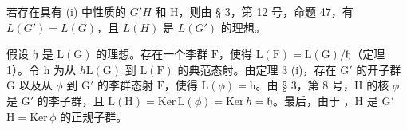 若存在具有 (i) 中性质的 \(G'\)\(H\) 和 H，则由 § 3，第 12 号，命题 47，有 \(L(G') = L(G)\)，且 \(L(H)\) 是 \(L(G')\) 的理想。

假设 \(\mathfrak{h}\) 是 \(\mathrm{L}(\mathrm{G})\) 的理想。存在一个李群 \(\mathrm{F}\)，使得 \(\mathrm{L}(\mathrm{F}) = \mathrm{L}(\mathrm{G}) / \mathfrak{h}\)（定理 1）。令 h 为从 \(h\)\(\mathrm{L}(\mathrm{G})\) 到 \(\mathrm{L}(\mathrm{F})\) 的典范态射。由定理 3 (i)，存在 \(\mathrm{G}'\) 的开子群 \(\mathrm{G}\) 以及从 \(\phi\) 到 \(\mathrm{G}'\) 的李群态射 \(\mathrm{F}\)，使得 \(\mathrm{L}(\phi) = \mathrm{h}\)。由 § 3，第 8 号，\(\mathrm{H}\) 的核 \(\phi\) 是 \(\mathrm{G}'\) 的李子群，且 \(\mathrm{L}(\mathrm{H}) = \mathrm{Ker} \, \mathrm{L}(\phi) = \mathrm{Ker} \, h = \mathfrak{h}\)。最后，由于 ，\(\mathrm{H}\) 是 \(\mathrm{G}'\)\(\mathrm{H} = \mathrm{Ker} \, \phi\) 的正规子群。

